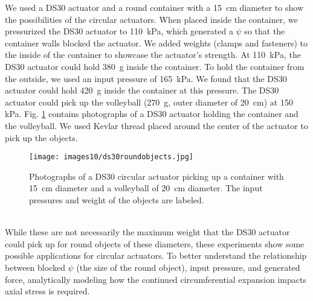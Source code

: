 We used a DS30 actuator and a round container with a 15~cm diameter to show the possibilities of the circular actuators. When placed inside the container, we pressurized the DS30 actuator to 110~kPa, which generated a $\psi$ so that the container walls blocked the actuator. We added weights (clamps and fasteners) to the inside of the container to showcase the actuator's strength. At 110~kPa, the DS30 actuator could hold 380~g inside the container. To hold the container from the outside, we used an input pressure of 165~kPa. We found that the DS30 actuator could hold 420~g inside the container at this pressure. The DS30 actuator could pick up the volleyball (270~g, outer diameter of 20~cm) at 150 kPa. Fig. \ref{fig:ds30roundobjects} contains photographs of a DS30 actuator holding the container and the volleyball. We used Kevlar thread placed around the center of the actuator to pick up the objects. 
\\
\begin{figure}[ht]
    \centering
     \texttt{[image: images10/ds30roundobjects.jpg]}
    \caption{Photographs of a DS30 circular actuator picking up a container with 15~cm diameter and a volleyball of 20~cm diameter. The input pressures and weight of the objects are labeled.}
    \label{fig:ds30roundobjects}
\end{figure}
\\
While these are not necessarily the maximum weight that the DS30 actuator could pick up for round objects of these diameters, these experiments show some possible applications for circular actuators. To better understand the relationship between blocked $\psi$ (the size of the round object), input pressure, and generated force, analytically modeling how the continued circumferential expansion impacts axial stress is required. 

